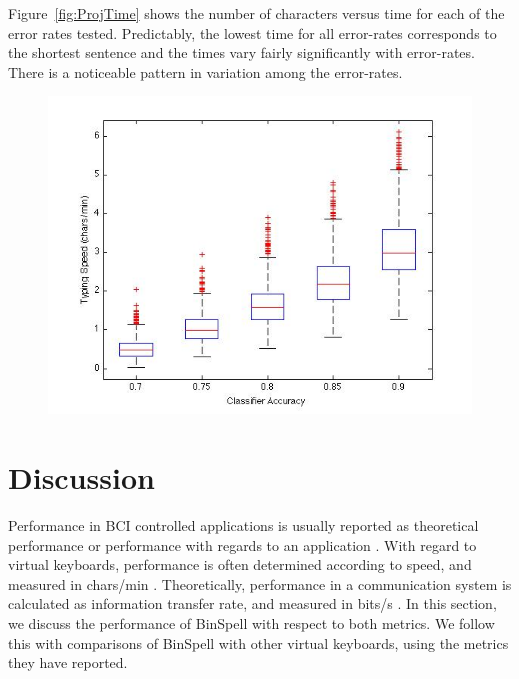 \documentclass[12pt,titlepage]{article}
\begin{document}
Figure~\ref{fig:ProjTime} shows the number of characters versus time for each of the error rates tested. 
Predictably, the lowest time for all error-rates corresponds to the shortest sentence and the 
times vary fairly significantly with error-rates.  There is a noticeable pattern in variation among 
the error-rates.

\begin{figure}[t]
\begin{center}
	\includegraphics[scale=0.40]{ProjTypeSpeedComp.jpg}
	\label{fig:TypeSpeed}
\end{center}
\end{figure}

\section{Discussion}

Performance in BCI controlled applications is usually reported as theoretical performance or performance with regards to an application \cite{wolpaw_braincomputer_2002}.  With regard to virtual keyboards, performance is often determined according to speed, and measured in chars/min \cite{blankertz_berlin_2006} \cite{donchin_mental_2000} \cite{wolpaw_braincomputer_2002}.  Theoretically, performance in a communication system is calculated as information transfer rate, and measured in bits/s \cite{wolpaw_braincomputer_2002}.  In this section, we discuss the performance of BinSpell with respect to both metrics.  We follow this with comparisons of BinSpell with other virtual keyboards, using the metrics they have reported.
\end{document}
